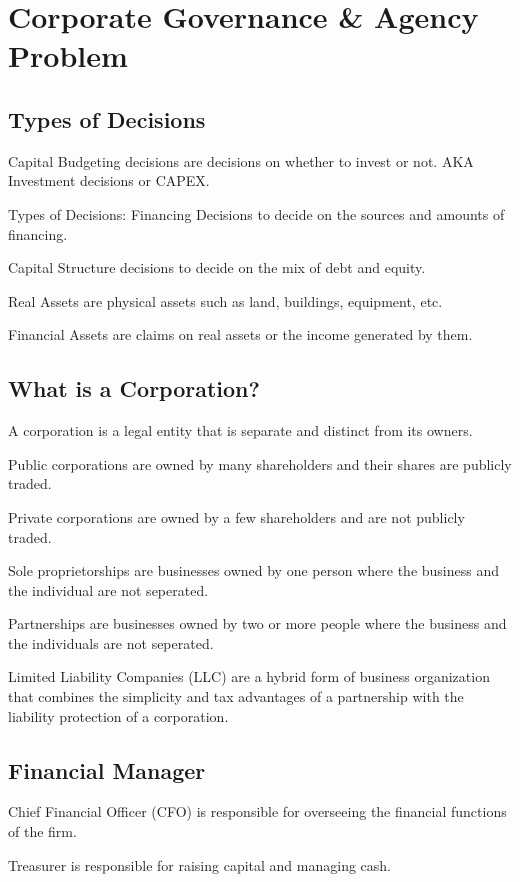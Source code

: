\section{Corporate Governance & Agency Problem}
\subsection{Types of Decisions}
Capital Budgeting decisions are decisions on whether to invest or not.
AKA Investment decisions or CAPEX.

Types of Decisions:
Financing Decisions to decide on the sources and amounts of financing.

Capital Structure decisions to decide on the mix of debt and equity.

Real Assets are physical assets such as land, buildings, equipment, etc.

Financial Assets are claims on real assets or the income generated by them.

\subsection{What is a Corporation?}

A corporation is a legal entity that is separate and distinct from its owners.

Public corporations are owned by many shareholders and their shares are publicly traded.

Private corporations are owned by a few shareholders and are not publicly traded.

Sole proprietorships are businesses owned by one person where the business and the individual are not seperated.

Partnerships are businesses owned by two or more people where the business and the individuals are not seperated.

Limited Liability Companies (LLC) are a hybrid form of business organization that combines the simplicity and tax advantages of a partnership with the liability protection of a corporation.

\subsection{Financial Manager}

Chief Financial Officer (CFO) is responsible for overseeing the financial functions of the firm.

Treasurer is responsible for raising capital and managing cash.

